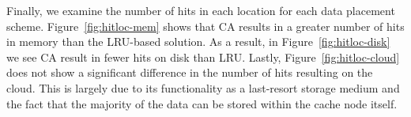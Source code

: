 Finally, we examine the number of hits in each location for each data placement
scheme. Figure~\ref{fig:hitloc-mem} shows that CA results in a greater number
of hits in memory than the LRU-based solution. As a result, in
Figure~\ref{fig:hitloc-disk} we see CA result in fewer hits on disk than LRU\@.
Lastly, Figure~\ref{fig:hitloc-cloud} does not show a significant difference in
the number of hits resulting on the cloud. This is largely due to its
functionality as a last-resort storage medium and the fact that the majority of
the data can be stored within the cache node itself.

